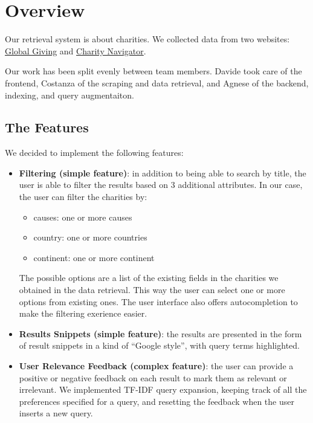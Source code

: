 \documentclass[unicode,9pt,a4paper,oneside,numbers=endperiod,openany]{scrartcl}
\begin{document}
\setassignment
{}

\newline

\section{Overview}

Our retrieval system is about charities. We collected data from two websites: \href{https://www.globalgiving.org}{Global Giving} and \href{https://www.charitynavigator.org}{Charity Navigator}.

Our work has been split evenly between team members. Davide took care of the frontend, Costanza of the scraping and data retrieval, and Agnese of the backend, indexing, and query augmentaiton.
\subsection{The Features}

We decided to implement the following features:

\begin{itemize}
    \item \textbf{Filtering (simple feature)}: in addition to being able to search by title, the user is able to filter the results based on 3 additional attributes.
          In our case, the user can filter the charities by:
          \begin{itemize}
              \item causes: one or more causes
              \item country: one or more countries
              \item continent: one or more continent
          \end{itemize}

          The possible options are a list of the existing fields in the charities we obtained in the data retrieval. This way the user can select one or more options from existing ones.
          The user interface also offers autocompletion to make the filtering exerience easier.

    \item \textbf{Results Snippets (simple feature)}: the results are presented in the form of result snippets in a
          kind of “Google style”, with query terms highlighted.
    \item \textbf{User Relevance Feedback (complex feature)}: the user can provide a positive or negative feedback on each result to mark them as relevant or irrelevant. We implemented TF-IDF query expansion, keeping track of all the preferences specified for a query, and resetting the feedback when the user inserts a new query.
\end{itemize}
\end{document}
